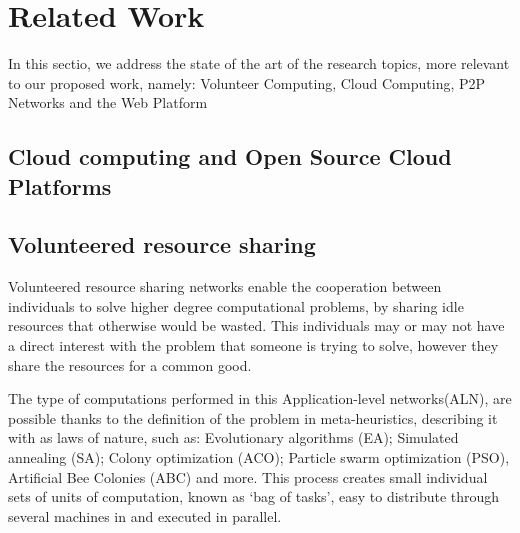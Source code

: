 
% 
% 

\section{Related Work}
In this sectio, we address the state of the art of the research topics, more relevant to our proposed work, namely: Volunteer Computing, Cloud Computing, P2P Networks and the Web Platform

% 
% 
\subsection{Cloud computing and Open Source Cloud Platforms}
%  













% 
% 
\subsection{Volunteered resource sharing}

Volunteered resource sharing networks enable the cooperation between individuals to solve higher degree computational problems, by sharing idle resources that otherwise would be wasted. This individuals may or may not have a direct interest with the problem that someone is trying to solve, however they share the resources for a common good. 

The type of computations performed in this Application-level networks(ALN), are possible thanks to the definition of the problem in meta-heuristics, describing it with as laws of nature\cite{Duda2013}, such as: Evolutionary algorithms (EA); Simulated annealing (SA); Colony optimization (ACO); Particle swarm optimization (PSO), Artificial Bee Colonies (ABC) and more. This process creates small individual sets of units of computation, known as `bag of tasks', easy to distribute through several machines in and executed in parallel.
                  
